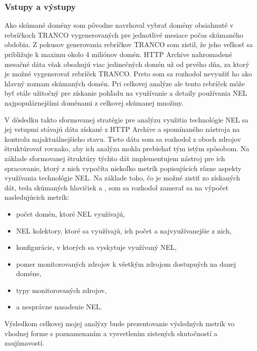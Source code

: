 \subsubsection{Vstupy a výstupy}

Ako skúmané domény som pôvodne navrhoval vybrať domény obsiahnuté v rebríčkoch TRANCO vygenerovaných pre jednotlivé mesiace počas skúmaného obdobia.
Z pokusov generovania rebríčkov TRANCO som zistil, že jeho veľkosť sa približuje k maximu okolo 4 miliónov domén.
HTTP Archive nahromadené mesačné dáta však obsahujú viac jedinečných domén už od prvého dňa, za ktorý je možné vygenerovať rebríček TRANCO.
Preto som sa rozhodol nevyužiť ho ako hlavný zoznam skúmaných domén.
Pri celkovej analýze ale tento rebríček môže byť stále užitočný pre získanie pohľadu na využívanie a detaily používania NEL najpopulárnejšími doménami z celkovej skúmanej množiny.

V dôsledku takto sformovanej stratégie pre analýzu využitia technológie NEL sa jej vstupmi stávajú dáta získané z HTTP Archive a spomínaného nástroja na kontrolu najaktuálnejšieho stavu.
Tieto dáta som sa rozhodol z oboch zdrojov štruktúrovať rovnako, aby ich analýza mohla prebiehať tým istým spôsobom.
Na základe sformovanej štruktúry týchto dát implementujem nástroj pre ich spracovanie, ktorý z nich vypočíta niekoľko metrík popisujúcich rôzne aspekty využívania technológie NEL.
Na základe toho, čo je možné zistiť zo získaných dát, teda skúmaných hlavičiek  a , som sa rozhodol zamerať sa na výpočet nasledujúcich metrík:
\begin{itemize}
    \item počet domén, ktoré NEL využívajú,
    \item NEL kolektory, ktoré sa využívajú, ich počet a najvyužívanejšie z nich,
    \item konfigurácie, v ktorých sa vyskytuje využívaný NEL,
    \item pomer monitorovaných zdrojov k všetkým zdrojom dostupných na danej doméne,
    \item typy monitorovaných zdrojov,
    \item a nesprávne nasadenie NEL.
\end{itemize}

Výsledkom celkovej mojej analýzy bude prezentovanie výsledných metrík vo vhodnej forme s poznamenaním a vysvetlením zistených skutočností a zaujímavostí. 

\pagebreak

